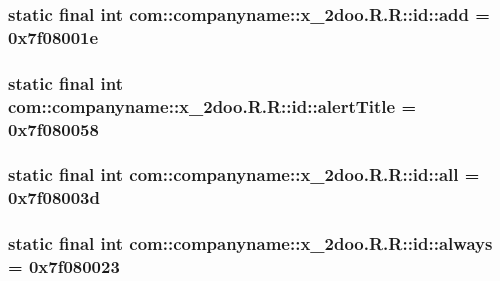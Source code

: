 \hypertarget{classcom_1_1companyname_1_1x__2doo_1_1_r_1_1id_293f2cc2c45a16279cd141323d2bdd17}{
\subsubsection[{add}]{\setlength{\rightskip}{0pt plus 5cm}static final int com::companyname::x\_\-2doo.R.R::id::add = 0x7f08001e}}
\label{classcom_1_1companyname_1_1x__2doo_1_1_r_1_1id_293f2cc2c45a16279cd141323d2bdd17}


\hypertarget{classcom_1_1companyname_1_1x__2doo_1_1_r_1_1id_58b10cccb33f4420609b2d019b6de005}{
\subsubsection[{alertTitle}]{\setlength{\rightskip}{0pt plus 5cm}static final int com::companyname::x\_\-2doo.R.R::id::alertTitle = 0x7f080058}}
\label{classcom_1_1companyname_1_1x__2doo_1_1_r_1_1id_58b10cccb33f4420609b2d019b6de005}


\hypertarget{classcom_1_1companyname_1_1x__2doo_1_1_r_1_1id_eeab2f5d2470c9311126fb34b565b059}{
\subsubsection[{all}]{\setlength{\rightskip}{0pt plus 5cm}static final int com::companyname::x\_\-2doo.R.R::id::all = 0x7f08003d}}
\label{classcom_1_1companyname_1_1x__2doo_1_1_r_1_1id_eeab2f5d2470c9311126fb34b565b059}


\hypertarget{classcom_1_1companyname_1_1x__2doo_1_1_r_1_1id_ab07a05b36c09db3bfae92e2493a80ed}{
\subsubsection[{always}]{\setlength{\rightskip}{0pt plus 5cm}static final int com::companyname::x\_\-2doo.R.R::id::always = 0x7f080023}}
\label{classcom_1_1companyname_1_1x__2doo_1_1_r_1_1id_ab07a05b36c09db3bfae92e2493a80ed}



